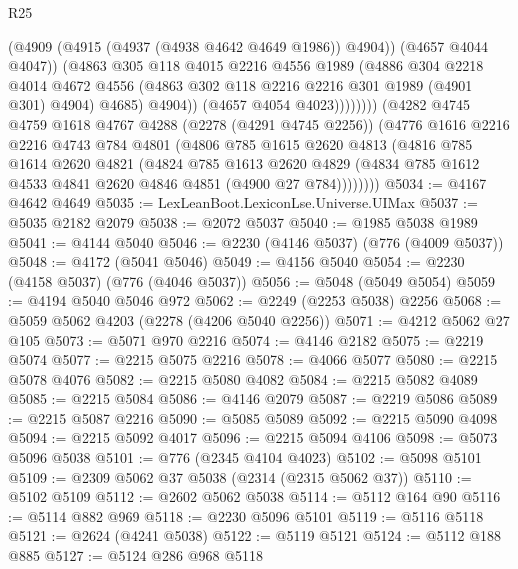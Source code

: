 \begin{lexlean}{R25}
\begin{coremodule}
                        (@4909 (@4915 (@4937 (@4938 @4642 @4649 @1986)) @4904))
                        (@4657 @4044 @4047))
                      (@4863
                        @305
                        @118
                        @4015
                        @2216
                        @4556
                        @1989
                        (@4886
                          @304
                          @2218
                          @4014
                          @4672
                          @4556
                          (@4863 @302 @118 @2216 @2216 @301 @1989 (@4901 @301) @4904)
                          @4685)
                        @4904))
                    (@4657 @4054 @4023))))))))
      (@4282
        @4745
        @4759
        @1618
        @4767
        @4288
        (@2278 (@4291 @4745 @2256))
        (@4776
          @1616
          @2216
          @2216
          @4743
          @784
          @4801
          (@4806
            @785
            @1615
            @2620
            @4813
            (@4816
              @785
              @1614
              @2620
              @4821
              (@4824
                @785
                @1613
                @2620
                @4829
                (@4834 @785 @1612 @4533 @4841 @2620 @4846 @4851 (@4900 @27 @784))))))))
@5034 := @4167 @4642 @4649
@5035 := LexLeanBoot.LexiconLse.Universe.UIMax
@5037 := @5035 @2182 @2079
@5038 := @2072 @5037
@5040 := @1985 @5038 @1989
@5041 := @4144 @5040
@5046 := @2230 (@4146 @5037) (@776 (@4009 @5037))
@5048 := @4172 (@5041 @5046)
@5049 := @4156 @5040
@5054 := @2230 (@4158 @5037) (@776 (@4046 @5037))
@5056 := @5048 (@5049 @5054)
@5059 := @4194 @5040 @5046 @972
@5062 := @2249 (@2253 @5038) @2256
@5068 := @5059 @5062 @4203 (@2278 (@4206 @5040 @2256))
@5071 := @4212 @5062 @27 @105
@5073 := @5071 @970 @2216
@5074 := @4146 @2182
@5075 := @2219 @5074
@5077 := @2215 @5075 @2216
@5078 := @4066 @5077
@5080 := @2215 @5078 @4076
@5082 := @2215 @5080 @4082
@5084 := @2215 @5082 @4089
@5085 := @2215 @5084
@5086 := @4146 @2079
@5087 := @2219 @5086
@5089 := @2215 @5087 @2216
@5090 := @5085 @5089
@5092 := @2215 @5090 @4098
@5094 := @2215 @5092 @4017
@5096 := @2215 @5094 @4106
@5098 := @5073 @5096 @5038
@5101 := @776 (@2345 @4104 @4023)
@5102 := @5098 @5101
@5109 := @2309 @5062 @37 @5038 (@2314 (@2315 @5062 @37))
@5110 := @5102 @5109
@5112 := @2602 @5062 @5038
@5114 := @5112 @164 @90
@5116 := @5114 @882 @969
@5118 := @2230 @5096 @5101
@5119 := @5116 @5118
@5121 := @2624 (@4241 @5038)
@5122 := @5119 @5121
@5124 := @5112 @188 @885
@5127 := @5124 @286 @968 @5118

\end{coremodule}
\end{lexlean}
